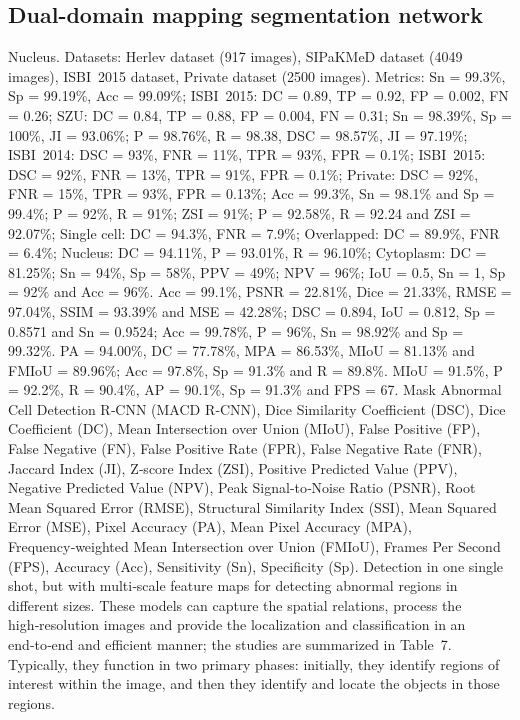 \documentclass{svjour3}
\begin{document}
\subsection{Dual-domain mapping segmentation network}
Nucleus. Datasets: Herlev dataset (917 images), SIPaKMeD dataset (4049 images), ISBI 2015 dataset, Private dataset (2500 images). 
Metrics: Sn = 99.3\%, Sp = 99.19\%, Acc = 99.09\%; ISBI 2015: DC = 0.89, TP = 0.92, FP = 0.002, FN = 0.26; SZU: DC = 0.84, TP = 0.88, FP = 0.004, FN = 0.31; Sn = 98.39\%, Sp = 100\%, JI = 93.06\%; P = 98.76\%, R = 98.38, DSC = 98.57\%, JI = 97.19\%; ISBI 2014: DSC = 93\%, FNR = 11\%, TPR = 93\%, FPR = 0.1\%; ISBI 2015: DSC = 92\%, FNR = 13\%, TPR = 91\%, FPR = 0.1\%; Private: DSC = 92\%, FNR = 15\%, TPR = 93\%, FPR = 0.13\%; Acc = 99.3\%, Sn = 98.1\% and Sp = 99.4\%; P = 92\%, R = 91\%; ZSI = 91\%; P = 92.58\%, R = 92.24 and ZSI = 92.07\%; Single cell: DC = 94.3\%, FNR = 7.9\%; Overlapped: DC = 89.9\%, FNR = 6.4\%; Nucleus: DC = 94.11\%, P = 93.01\%, R = 96.10\%; Cytoplasm: DC = 81.25\%; Sn = 94\%, Sp = 58\%, PPV = 49\%; NPV = 96\%; IoU = 0.5, Sn = 1, Sp = 92\% and Acc = 96\%.
Acc = 99.1\%, PSNR = 22.81\%, Dice = 21.33\%, RMSE = 97.04\%, SSIM = 93.39\% and MSE = 42.28\%; DSC = 0.894, IoU = 0.812, Sp = 0.8571 and Sn = 0.9524; Acc = 99.78\%, P = 96\%, Sn = 98.92\% and Sp = 99.32\%.
PA = 94.00\%, DC = 77.78\%, MPA = 86.53\%, MIoU = 81.13\% and FMIoU = 89.96\%; Acc = 97.8\%, Sp = 91.3\% and R = 89.8\%.
MIoU = 91.5\%, P = 92.2\%, R = 90.4\%, AP = 90.1\%, Sp = 91.3\% and FPS = 67.
Mask Abnormal Cell Detection R‑CNN (MACD R‑CNN), Dice Similarity Coefficient (DSC), Dice Coefficient (DC), Mean Intersection over Union (MIoU), False Positive (FP), False Negative (FN), False Positive Rate (FPR), False Negative Rate (FNR), Jaccard Index (JI), Z‑score Index (ZSI), Positive Predicted Value (PPV), Negative Predicted Value (NPV), Peak Signal‑to‑Noise Ratio (PSNR), Root Mean Squared Error (RMSE), Structural Similarity Index (SSI), Mean Squared Error (MSE), Pixel Accuracy (PA), Mean Pixel Accuracy (MPA), Frequency‑weighted Mean Intersection over Union (FMIoU), Frames Per Second (FPS), Accuracy (Acc), Sensitivity (Sn), Specificity (Sp).
Detection in one single shot, but with multi‑scale feature maps for detecting abnormal regions in different sizes. These models can capture the spatial relations, process the high‑resolution images and provide the localization and classification in an end‑to‑end and efficient manner; the studies are summarized in Table 7. Typically, they function in two primary phases: initially, they identify regions of interest within the image, and then they identify and locate the objects in those regions.
\end{document}
